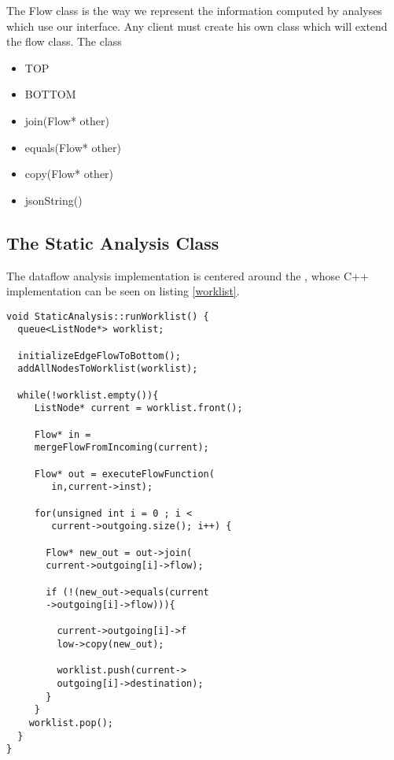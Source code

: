 The Flow class is the way we represent the information computed by analyses which use our interface. Any client must create his own class which will extend the flow class. The class 

\begin{itemize}
\item TOP
\item BOTTOM
\item join(Flow* other)
\item equals(Flow* other)
\item copy(Flow* other)
\item jsonString()
\end{itemize}


\subsection{The Static Analysis Class}

The dataflow analysis implementation is centered around the , whose C++ implementation can be seen on listing \ref{worklist}.

\begin{lstlisting}[caption=Worklist Algorithm, label=worklist]
void StaticAnalysis::runWorklist() {
  queue<ListNode*> worklist;
  
  initializeEdgeFlowToBottom();
  addAllNodesToWorklist(worklist);
  
  while(!worklist.empty()){
     ListNode* current = worklist.front();
     
     Flow* in = 
     mergeFlowFromIncoming(current);
     
     Flow* out = executeFlowFunction(
     	in,current->inst);
     
     for(unsigned int i = 0 ; i < 
     	current->outgoing.size(); i++) {
       
       Flow* new_out = out->join(
       current->outgoing[i]->flow);
     
       if (!(new_out->equals(current
       ->outgoing[i]->flow))){
     
         current->outgoing[i]->f
         low->copy(new_out);
     
         worklist.push(current->
         outgoing[i]->destination);
       }
     }
    worklist.pop();
  }
}
\end{lstlisting}
